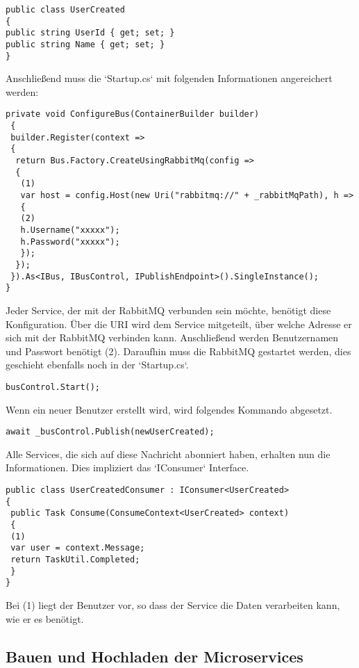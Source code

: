 \begin{verbatim}
public class UserCreated
{
public string UserId { get; set; }
public string Name { get; set; }
}
\end{verbatim}

Anschließend muss die `Startup.cs` mit folgenden Informationen angereichert werden: 

\begin{verbatim}
private void ConfigureBus(ContainerBuilder builder)
 {
 builder.Register(context =>
 {
  return Bus.Factory.CreateUsingRabbitMq(config =>
  { 
   (1)
   var host = config.Host(new Uri("rabbitmq://" + _rabbitMqPath), h =>
   {
   (2)
   h.Username("xxxxx");  
   h.Password("xxxxx");
   });
  });
 }).As<IBus, IBusControl, IPublishEndpoint>().SingleInstance();
}
\end{verbatim}

Jeder Service, der mit der RabbitMQ verbunden sein möchte, benötigt diese Konfiguration. Über die URI wird dem Service mitgeteilt, über welche Adresse er sich mit der RabbitMQ verbinden kann. Anschließend werden Benutzernamen und Passwort benötigt (2). Daraufhin muss die RabbitMQ gestartet werden, dies geschieht ebenfalls noch in der `Startup.cs`.

\begin{verbatim}
busControl.Start();
\end{verbatim}

Wenn ein neuer Benutzer erstellt wird, wird folgendes Kommando abgesetzt.

\begin{verbatim}
await _busControl.Publish(newUserCreated);
\end{verbatim}

Alle Services, die sich auf diese Nachricht abonniert haben, erhalten nun die Informationen. Dies impliziert das `IConsumer` Interface.  

\begin{verbatim}
public class UserCreatedConsumer : IConsumer<UserCreated>
{
 public Task Consume(ConsumeContext<UserCreated> context)
 {
 (1)
 var user = context.Message;
 return TaskUtil.Completed;
 }
}
\end{verbatim}

Bei (1) liegt der Benutzer vor, so dass der Service die Daten verarbeiten kann, wie er es benötigt. 

\subsection{Bauen und Hochladen der Microservices}

